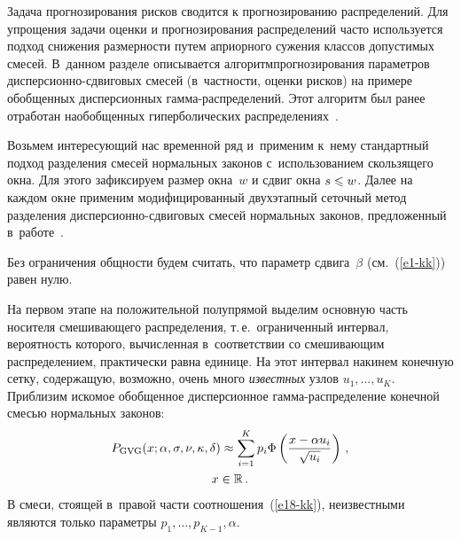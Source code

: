 \begin{multicols}{2}
Задача прогнозирования рисков сводится к прогнозированию
распределений. Для упрощения задачи оценки и прогнозирования
распределений час\-то используется подход снижения размерности путем
априорного сужения классов допустимых смесей. 
%
В~данном разделе
описывается алгоритм\linebreak прогнозирования параметров
дис\-пер\-си\-он\-но-сдви\-го\-вых смесей (в~част\-ности, оценки рисков) на\linebreak
примере обобщенных дисперсионных гам\-ма-рас\-пре\-де\-ле\-ний. Этот алгоритм
был ранее отработан на\linebreak обобщенных гиперболических распределениях~\cite{KorolevKorchagin2015}.

Возьмем интересующий нас временной ряд и~применим к~нему стандартный
подход разделения смесей нормальных законов с~использованием
скользящего окна. Для этого зафиксируем размер окна~$w$ и сдвиг окна
$s\hm\leqslant w$. Далее на каждом окне применим модифицированный двухэтапный
сеточный метод разделения дис\-пер\-си\-он\-но-сдви\-го\-вых смесей нормальных
законов, предложенный в~работе~\cite{kk2014}.

Без ограничения общности будем считать, что параметр сдвига~$\beta$
(см.~(\ref{e1-kk})) равен нулю.

На первом этапе на положительной полупрямой выделим основную часть
носителя смешивающего распределения, т.\,е.\ ограниченный интервал,
вероятность которого, вычисленная в~соответствии со смешивающим
распределением, практически равна единице. На этот интервал накинем
конечную сетку, содержащую, возможно, очень много {\it известных}
узлов $u_1,\ldots,u_K$. Приблизим искомое обобщенное дисперсионное
гам\-ма-рас\-пре\-де\-ле\-ние конечной смесью нормальных законов:
\begin{multline}
P_{\mathrm{GVG}}(x;\alpha,\sigma,\nu,\kappa,\delta)\approx
\sum_{i=1}^Kp_i\Phi\left(\displaystyle\frac{\displaystyle x-\alpha
u_i\mathstrut}{\displaystyle \sqrt{u_i}\mathstrut}\right)\,,\\
 x\in\mathbb{R}\,.\label{e18-kk}
\end{multline}
В смеси, стоящей в~правой части соотношения~(\ref{e18-kk}), неизвестными
являются только па\-ра\-мет\-ры $p_1,\ldots,p_{K-1},\alpha$. 


\end{multicols}
